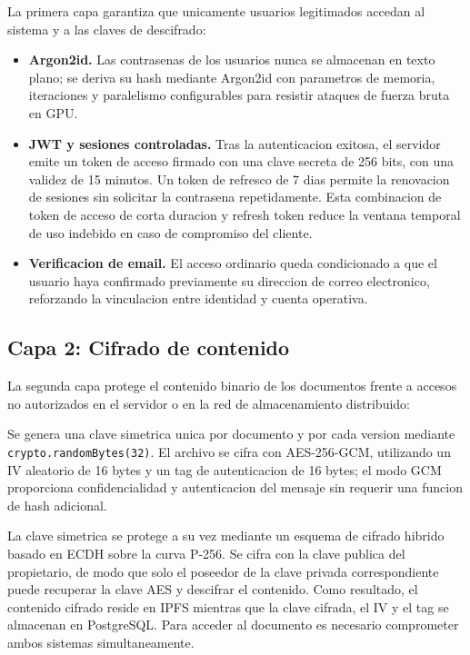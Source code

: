 \documentclass[11pt, a4paper]{article}
\begin{document}
La primera capa garantiza que unicamente usuarios legitimados accedan al sistema y a las claves de descifrado:

\begin{itemize}
    \item \textbf{Argon2id.} Las contrasenas de los usuarios nunca se almacenan en texto plano; se deriva su hash mediante Argon2id con parametros de memoria, iteraciones y paralelismo configurables para resistir ataques de fuerza bruta en GPU.
    \item \textbf{JWT y sesiones controladas.} Tras la autenticacion exitosa, el servidor emite un token de acceso firmado con una clave secreta de 256 bits, con una validez de 15 minutos. Un token de refresco de 7 dias permite la renovacion de sesiones sin solicitar la contrasena repetidamente. Esta combinacion de token de acceso de corta duracion y refresh token reduce la ventana temporal de uso indebido en caso de compromiso del cliente.
    \item \textbf{Verificacion de email.} El acceso ordinario queda condicionado a que el usuario haya confirmado previamente su direccion de correo electronico, reforzando la vinculacion entre identidad y cuenta operativa.
\end{itemize}

\subsection{Capa 2: Cifrado de contenido}

La segunda capa protege el contenido binario de los documentos frente a accesos no autorizados en el servidor o en la red de almacenamiento distribuido:

Se genera una clave simetrica unica por documento y por cada version mediante \texttt{crypto.randomBytes(32)}. El archivo se cifra con AES-256-GCM, utilizando un IV aleatorio de 16 bytes y un tag de autenticacion de 16 bytes; el modo GCM proporciona confidencialidad y autenticacion del mensaje sin requerir una funcion de hash adicional.

La clave simetrica se protege a su vez mediante un esquema de cifrado hibrido basado en ECDH sobre la curva P-256. Se cifra con la clave publica del propietario, de modo que solo el poseedor de la clave privada correspondiente puede recuperar la clave AES y descifrar el contenido. Como resultado, el contenido cifrado reside en IPFS mientras que la clave cifrada, el IV y el tag se almacenan en PostgreSQL. Para acceder al documento es necesario comprometer ambos sistemas simultaneamente.
\end{document}
